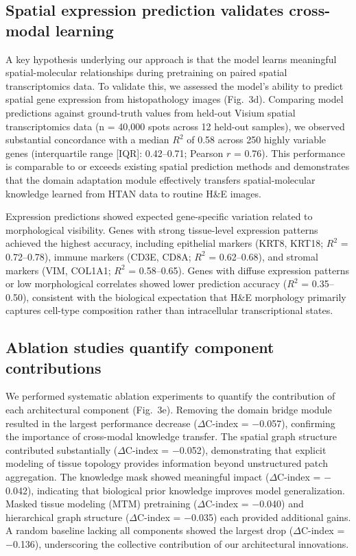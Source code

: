 \documentclass[pdflatex,sn-nature]{sn-jnl}%
\theoremstyle{thmstyleone}%
\theoremstyle{thmstyletwo}%
\theoremstyle{thmstylethree}%
\begin{document}
\subsection{Spatial expression prediction validates cross-modal learning}\label{subsec5}

A key hypothesis underlying our approach is that the model learns meaningful spatial-molecular relationships during pretraining on paired spatial transcriptomics data. To validate this, we assessed the model's ability to predict spatial gene expression from histopathology images (Fig.~3d). Comparing model predictions against ground-truth values from held-out Visium spatial transcriptomics data (n = 40,000 spots across 12 held-out samples), we observed substantial concordance with a median $R^2$ of 0.58 across 250 highly variable genes (interquartile range [IQR]: 0.42--0.71; Pearson $r$ = 0.76). This performance is comparable to or exceeds existing spatial prediction methods\cite{bib74,bib75} and demonstrates that the domain adaptation module effectively transfers spatial-molecular knowledge learned from HTAN data to routine H\&E images.

Expression predictions showed expected gene-specific variation related to morphological visibility. Genes with strong tissue-level expression patterns achieved the highest accuracy, including epithelial markers (KRT8, KRT18; $R^2$ = 0.72--0.78), immune markers (CD3E, CD8A; $R^2$ = 0.62--0.68), and stromal markers (VIM, COL1A1; $R^2$ = 0.58--0.65). Genes with diffuse expression patterns or low morphological correlates showed lower prediction accuracy ($R^2$ = 0.35--0.50), consistent with the biological expectation that H\&E morphology primarily captures cell-type composition rather than intracellular transcriptional states.

\subsection{Ablation studies quantify component contributions}\label{subsec6}

We performed systematic ablation experiments to quantify the contribution of each architectural component (Fig.~3e). Removing the domain bridge module resulted in the largest performance decrease ($\Delta$C-index = $-$0.057), confirming the importance of cross-modal knowledge transfer. The spatial graph structure contributed substantially ($\Delta$C-index = $-$0.052), demonstrating that explicit modeling of tissue topology provides information beyond unstructured patch aggregation. The knowledge mask showed meaningful impact ($\Delta$C-index = $-$0.042), indicating that biological prior knowledge improves model generalization. Masked tissue modeling (MTM) pretraining ($\Delta$C-index = $-$0.040) and hierarchical graph structure ($\Delta$C-index = $-$0.035) each provided additional gains. A random baseline lacking all components showed the largest drop ($\Delta$C-index = $-$0.136), underscoring the collective contribution of our architectural innovations.
\end{document}
